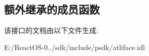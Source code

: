 \subsection*{额外继承的成员函数}


该接口的文档由以下文件生成\+:\begin{DoxyCompactItemize}
\item 
E\+:/\+React\+O\+S-\/0../sdk/include/psdk/atliface.\+idl\end{DoxyCompactItemize}
